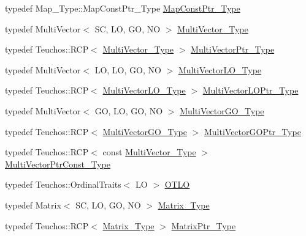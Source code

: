 \begin{DoxyCompactItemize}
typedef Map\+\_\+\+Type\+::\+Map\+Const\+Ptr\+\_\+\+Type \hyperlink{classFEDD_1_1AdaptiveMeshRefinement_a584bfb3398e9072ddf188bfa3c04c926}{Map\+Const\+Ptr\+\_\+\+Type}
\item 
typedef Multi\+Vector$<$ SC, LO, GO, NO $>$ \hyperlink{classFEDD_1_1AdaptiveMeshRefinement_afba165f2caa97c6de40654b1ee51e38d}{Multi\+Vector\+\_\+\+Type}
\item 
typedef Teuchos\+::\+R\+CP$<$ \hyperlink{classFEDD_1_1AdaptiveMeshRefinement_afba165f2caa97c6de40654b1ee51e38d}{Multi\+Vector\+\_\+\+Type} $>$ \hyperlink{classFEDD_1_1AdaptiveMeshRefinement_af4fb11adbdf1bba9bcaf8952324d32f2}{Multi\+Vector\+Ptr\+\_\+\+Type}
\item 
typedef Multi\+Vector$<$ LO, LO, GO, NO $>$ \hyperlink{classFEDD_1_1AdaptiveMeshRefinement_ae48fff0bc9a94bc0332516f1d1e05d92}{Multi\+Vector\+L\+O\+\_\+\+Type}
\item 
typedef Teuchos\+::\+R\+CP$<$ \hyperlink{classFEDD_1_1AdaptiveMeshRefinement_ae48fff0bc9a94bc0332516f1d1e05d92}{Multi\+Vector\+L\+O\+\_\+\+Type} $>$ \hyperlink{classFEDD_1_1AdaptiveMeshRefinement_a838fdef10af2d85bf1259037b821019e}{Multi\+Vector\+L\+O\+Ptr\+\_\+\+Type}
\item 
typedef Multi\+Vector$<$ GO, LO, GO, NO $>$ \hyperlink{classFEDD_1_1AdaptiveMeshRefinement_a582403f1b9f5ba542a6269e1b00a9031}{Multi\+Vector\+G\+O\+\_\+\+Type}
\item 
typedef Teuchos\+::\+R\+CP$<$ \hyperlink{classFEDD_1_1AdaptiveMeshRefinement_a582403f1b9f5ba542a6269e1b00a9031}{Multi\+Vector\+G\+O\+\_\+\+Type} $>$ \hyperlink{classFEDD_1_1AdaptiveMeshRefinement_ab2378e2061f0df4ec2df4a44af300996}{Multi\+Vector\+G\+O\+Ptr\+\_\+\+Type}
\item 
typedef Teuchos\+::\+R\+CP$<$ const \hyperlink{classFEDD_1_1AdaptiveMeshRefinement_afba165f2caa97c6de40654b1ee51e38d}{Multi\+Vector\+\_\+\+Type} $>$ \hyperlink{classFEDD_1_1AdaptiveMeshRefinement_a5af7c0982afd7187a77c802477675cc6}{Multi\+Vector\+Ptr\+Const\+\_\+\+Type}
\item 
typedef Teuchos\+::\+Ordinal\+Traits$<$ LO $>$ \hyperlink{classFEDD_1_1AdaptiveMeshRefinement_a5926fc86d008bfd69ae52e9190197eb0}{O\+T\+LO}
\item 
typedef Matrix$<$ SC, LO, GO, NO $>$ \hyperlink{classFEDD_1_1AdaptiveMeshRefinement_a607791df1d84bc4ea9fc08acd31225c7}{Matrix\+\_\+\+Type}
\item 
typedef Teuchos\+::\+R\+CP$<$ \hyperlink{classFEDD_1_1AdaptiveMeshRefinement_a607791df1d84bc4ea9fc08acd31225c7}{Matrix\+\_\+\+Type} $>$ \hyperlink{classFEDD_1_1AdaptiveMeshRefinement_a862a72ab4878d57a61b746f5ac8d0b6c}{Matrix\+Ptr\+\_\+\+Type}

\end{DoxyCompactItemize}
